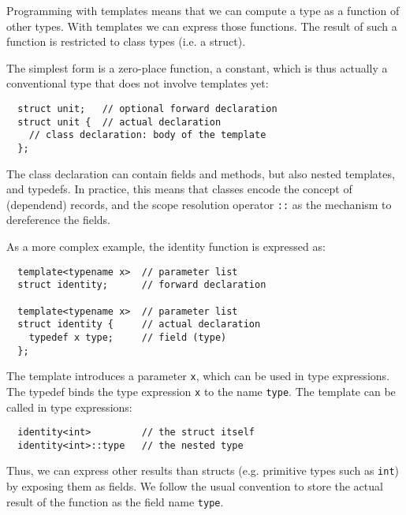 \documentclass{llncs}
\begin{document}
  Programming with templates means that we can compute a type as
  a function of other types. With templates we can express those
  functions. The result of such a function is restricted to class
  types (i.e. a struct).

  The simplest form is a zero-place function, a constant, which
  is thus actually a conventional type that does not involve
  templates yet:
  \begin{lstlisting}
  struct unit;   // optional forward declaration
  struct unit {  // actual declaration
    // class declaration: body of the template
  };
  \end{lstlisting}
  The class declaration can contain fields and methods, but also
  nested templates, and typedefs. In practice, this means that
  classes encode the concept of (dependend) records, and the
  scope resolution operator \lstinline$::$ as the mechanism
  to dereference the fields.

  As a more complex example, the identity function is expressed as:
  \begin{lstlisting}
  template<typename x>  // parameter list
  struct identity;      // forward declaration

  template<typename x>  // parameter list
  struct identity {     // actual declaration
    typedef x type;     // field (type)
  };
  \end{lstlisting}
  The template introduces a parameter \lstinline$x$, which can
  be used in type expressions. The typedef binds the type
  expression \lstinline$x$ to the name \lstinline$type$.
  The template can be called in type expressions:
  \begin{lstlisting}
  identity<int>         // the struct itself
  identity<int>::type   // the nested type
  \end{lstlisting}
  Thus, we can express other results than structs (e.g. primitive
  types such as \lstinline$int$) by exposing them as fields.
  We follow the usual convention to store the actual result of the
  function as the field name \lstinline$type$.
\end{document}
